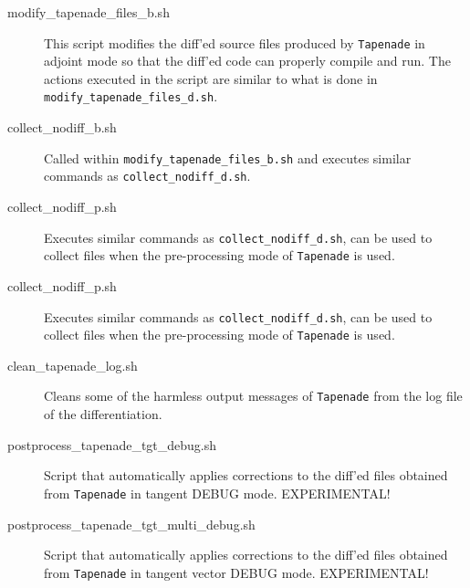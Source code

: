 \begin{sloppypar}
\begin{description}
  \item[modify\_tapenade\_files\_b.sh] This script modifies the diff'ed source files produced by {\tt Tapenade} in adjoint mode so that the diff'ed code can properly compile and run. The actions executed in the script are similar to what is done in {\tt modify\_tapenade\_files\_d.sh}.

  \item[collect\_nodiff\_b.sh] Called within {\tt modify\_tapenade\_files\_b.sh} and executes similar commands as {\tt collect\_nodiff\_d.sh}.

  \item[collect\_nodiff\_p.sh] Executes similar commands as {\tt collect\_nodiff\_d.sh}, can be used to collect files when the pre-processing mode of {\tt Tapenade} is used.

  \item[collect\_nodiff\_p.sh] Executes similar commands as {\tt collect\_nodiff\_d.sh}, can be used to collect files when the pre-processing mode of {\tt Tapenade} is used.

  \item[clean\_tapenade\_log.sh] Cleans some of the harmless output messages of {\tt Tapenade} from the log file of the differentiation.

  \item[postprocess\_tapenade\_tgt\_debug.sh] Script that automatically applies corrections to the diff'ed files obtained from {\tt Tapenade} in tangent DEBUG mode. EXPERIMENTAL!

  \item[postprocess\_tapenade\_tgt\_multi\_debug.sh] Script that automatically applies corrections to the diff'ed files obtained from {\tt Tapenade} in tangent vector DEBUG mode. EXPERIMENTAL!
\end{description}
\end{sloppypar}
